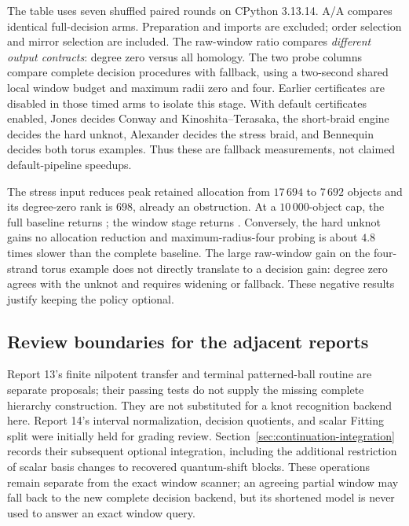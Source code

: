 

The table uses seven shuffled paired rounds on CPython 3.13.14. A/A compares
identical full-decision arms. Preparation and imports are excluded; order
selection and mirror selection are included. The raw-window ratio compares
\emph{different output contracts}: degree zero versus all homology. The two
probe columns compare complete decision procedures with fallback, using a
two-second shared local window budget and maximum radii zero and four.
Earlier certificates are disabled in those timed arms to isolate this stage.
With default certificates enabled, Jones decides Conway and Kinoshita--Terasaka,
the short-braid engine decides the hard unknot, Alexander decides the stress
braid, and Bennequin decides both torus examples. Thus these are fallback
measurements, not claimed default-pipeline speedups.

The stress input reduces peak retained allocation from $17\,694$ to
$7\,692$ objects and its degree-zero rank is $698$, already an obstruction.
At a $10\,000$-object cap, the full baseline returns ; the
window stage returns . Conversely, the hard unknot gains no
allocation reduction and maximum-radius-four probing is about $4.8$ times
slower than the complete baseline. The large raw-window gain on the
four-strand torus example does not directly translate to a decision gain:
degree zero agrees with the unknot and requires widening or fallback.
These negative results justify keeping the policy optional.

\subsection{Review boundaries for the adjacent reports}
Report 13's finite nilpotent transfer and terminal patterned-ball routine
are separate proposals; their passing tests do not supply the missing
complete hierarchy construction. They are not substituted for a knot
recognition backend here. Report 14's interval normalization, decision
quotients, and scalar Fitting split were initially held for grading review.
Section~\ref{sec:continuation-integration} records their subsequent optional
integration, including the additional restriction of scalar basis changes
to recovered quantum-shift blocks. These operations remain separate from
the exact window scanner; an agreeing partial window may fall back to the
new complete decision backend, but its shortened model is never used to
answer an exact window query.
